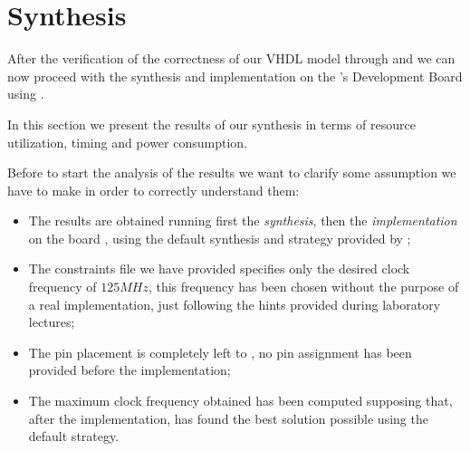 \chapter{Synthesis}\label{ch:synthesis}

After the verification of the correctness of our VHDL model through \matlab{}
and \modelsim{} we can now proceed with the synthesis and implementation on the
\xilinx's \zybo{} Development Board using \vivado.

In this section we present the results of our synthesis in terms of resource
utilization, timing and power consumption.

Before to start the analysis of the results we want to clarify some assumption
we have to make in order to correctly understand them:
\begin{itemize}
	\item The results are obtained running first the \emph{synthesis}, then
		the \emph{implementation} on the board \zybomodel,
		using the default synthesis and strategy provided by \vivado*;
	\item The constraints file we have provided specifies only the desired
		clock frequency of \(125 MHz\), this frequency has been chosen
		without the purpose of a real implementation, just following the
		hints provided during laboratory lectures;
	\item The pin placement is completely left to \vivado*, no pin
		assignment has been provided before the implementation;
	\item The maximum clock frequency obtained has been computed supposing
		that, after the implementation, \vivado* has found the best
		solution possible using the default strategy.
\end{itemize}






